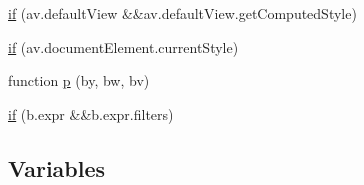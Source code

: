 \begin{DoxyCompactItemize}
\item 
\hyperlink{docs_2_programmer's_manual_2html_2jquery_8js_a30d3d2cd5b567c9f31b2aa30b9cb3bb8}{if} (av.\+default\+View \&\&av.\+default\+View.\+get\+Computed\+Style)
\item 
\hyperlink{docs_2_programmer's_manual_2html_2jquery_8js_a2c54bd8ed7482e89d19331ba61fe221c}{if} (av.\+document\+Element.\+current\+Style)
\item 
function \hyperlink{docs_2_programmer's_manual_2html_2jquery_8js_a2335e57f79b6acfb6de59c235dc8a83e}{p} (by, bw, bv)
\item 
\hyperlink{docs_2_programmer's_manual_2html_2jquery_8js_a42cbfadee2b4749e8f699ea8d745a0e4}{if} (b.\+expr \&\&b.\+expr.\+filters)
\end{DoxyCompactItemize}
\subsection*{Variables}
